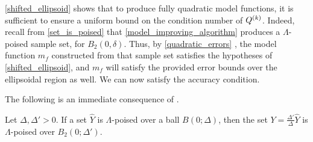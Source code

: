 \cref{shifted_ellipsoid} shows that to produce fully quadratic model functions,
it is sufficient to ensure a uniform bound on the condition number of ${Q^{(k)}}$.
Indeed, recall from \cref{set_is_poised} that \cref{model_improving_algorithm} produces a $\Lambda$-poised sample set, for $B_2(0,\delta)$.
Thus, by \cref{quadratic_errors}
, the model function $\hat{m}_f$ constructed from that sample set 
satisfies the hypotheses of \cref{shifted_ellipsoid},
and $m_f$ will satisfy the provided error bounds over the ellipsoidal region as well.
We can now satisfy the accuracy condition.








%


The following is an immediate consequence of \cite[Lemma 3.8]{introduction_book}.
\begin{lemma}
\label{scale_the_set}
Let $\Delta, \Delta' > 0$.
If a set $\hat Y$ is $\Lambda$-poised over a ball $B(0; \Delta)$,
then the set $Y = \frac{\Delta'}{\Delta} \hat Y$ is $\Lambda$-poised over $B_2(0; \Delta')$.
\end{lemma}

